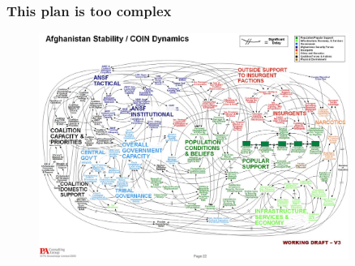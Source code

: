 \begin{frame}
\frametitle{This plan is too complex}

\begin{figure}[htbp]
\begin{center}
\includegraphics[width=0.9\textwidth]{images/afghanistan-1300.jpeg}
\end{center}
\end{figure}


\end{frame}


